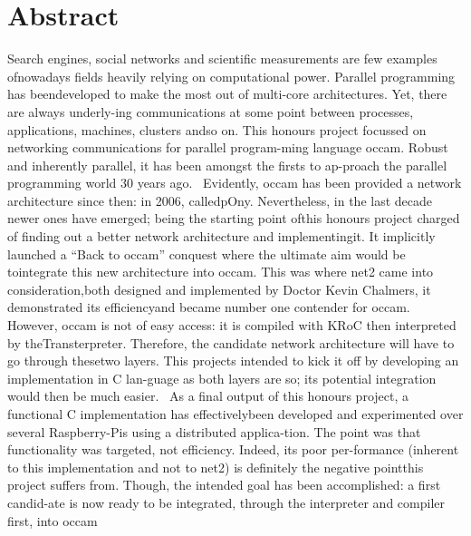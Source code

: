 \hypertarget{index_Abstract_section}{}\section{Abstract}\label{index_Abstract_section}
Search engines, social networks and scientific measurements are few examples ofnowadays fields heavily relying on computational power. Parallel programming has beendeveloped to make the most out of multi-\/core architectures. Yet, there are always underly-\/ing communications at some point between processes, applications, machines, clusters andso on. This honours project focussed on networking communications for parallel program-\/ming language occam. Robust and inherently parallel, it has been amongst the firsts to ap-\/proach the parallel programming world 30 years ago.~\newline
 Evidently, occam has been provided a network architecture since then\+: in 2006, calledp\+Ony. Nevertheless, in the last decade newer ones have emerged; being the starting point ofthis honours project charged of finding out a better network architecture and implementingit. It implicitly launched a “\+Back to occam” conquest where the ultimate aim would be tointegrate this new architecture into occam. This was where net2 came into consideration,both designed and implemented by Doctor Kevin Chalmers, it demonstrated its efficiencyand became number one contender for occam.~\newline
 However, occam is not of easy access\+: it is compiled with K\+Ro\+C then interpreted by the\+Transterpreter. Therefore, the candidate network architecture will have to go through thesetwo layers. This projects intended to kick it off by developing an implementation in C lan-\/guage as both layers are so; its potential integration would then be much easier.~\newline
 As a final output of this honours project, a functional C implementation has effectivelybeen developed and experimented over several Raspberry-\/\+Pis using a distributed applica-\/tion. The point was that functionality was targeted, not efficiency. Indeed, its poor per-\/formance (inherent to this implementation and not to net2) is definitely the negative pointthis project suffers from. Though, the intended goal has been accomplished\+: a first candid-\/ate is now ready to be integrated, through the interpreter and compiler first, into occam 